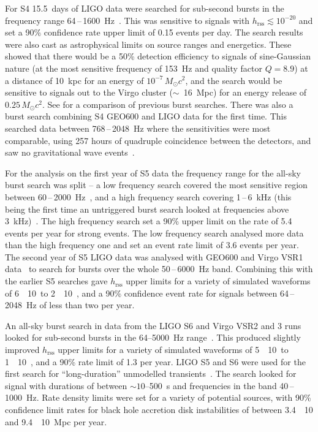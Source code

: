 For S4 15.5~days of LIGO data were searched for sub-second bursts in the frequency range 
64\,--\,1600~Hz~\cite{Abbott:2007b}. This was sensitive to signals with $h_{\mathrm{rss}}\lesssim10^{-20}$ 
and set a 90\% confidence rate upper limit of 0.15 events per day. The search results were also cast as 
astrophysical limits on source ranges and energetics. These showed that there would be a 50\% detection
efficiency to signals of sine-Gaussian nature (at the most sensitive frequency of 153~Hz and quality factor 
$Q=8.9$) at a distance of 10~kpc for an energy of $10^{-7}\,M_{\odot}c^2$, and the search would be sensitive 
to signals out to the Virgo cluster ($\sim$~16~Mpc) for an energy release of $0.25\,M_{\odot}c^2$. See
\cite{Abbott:2007b} for a comparison of previous burst searches. There was also a burst search combining S4 
GEO600 and LIGO data for the first time. This searched data between 768\,--\,2048~Hz where the sensitivities 
were most comparable, using 257 hours of quadruple coincidence between the detectors, and saw no
gravitational wave events~\cite{Abbott:2008b}.

For the analysis on the first year of S5 data the frequency range for the all-sky burst search was split -- a 
low frequency search covered the most sensitive region between 60\,--\,2000~Hz~\cite{Abbott:2009h}, and a 
high frequency search covering 1\,--\,6~kHz (this being the first time an untriggered burst search looked at 
frequencies above 3~kHz)~\cite{Abbott:2009i}. The high frequency search set a 90\% upper limit on the rate of 
5.4 events per year for strong events. The low frequency search analysed more data than the high frequency 
one and set an event rate limit of 3.6 events per year. The second year of S5 LIGO data was analysed with 
GEO600 and Virgo VSR1 data~\cite{Abadie:2010d} to search for bursts over the whole 50\,--\,6000~Hz band. 
Combining this with the earlier S5 searches gave $h_{\mathrm{rss}}$ upper limits for a variety of
simulated waveforms of 6~\texttimes~10~\Hz to 2~\texttimes~10~\Hz, and a 90\% 
confidence event rate for signals between 64\,--\,2048~Hz of less than two per year.

An all-sky burst search in data from the LIGO S6 and Virgo VSR2 and 3 runs looked for sub-second bursts in 
the 64--5000~Hz range~\cite{2012PhRvD..85l2007A}. This produced slightly improved $h_{\mathrm{rss}}$ upper 
limits for a variety of simulated waveforms of 5~\texttimes~10~\Hz to 
1~\texttimes~10~\Hz, and a 90\% rate limit of 1.3 per year. LIGO S5 and S6 were used for the 
first search for ``long-duration'' unmodelled transients~\cite{2016PhRvD..93d2005A}. The search looked for 
signal with durations of between $\sim 10$--500~s and frequencies in the band 40\,--\,1000~Hz. Rate density 
limits were set for a variety of potential sources, with 90\% confidence limit rates for black hole accretion 
disk instabilities of between 3.4~\texttimes~10 and 9.4~\texttimes~10~Mpc per 
year.

